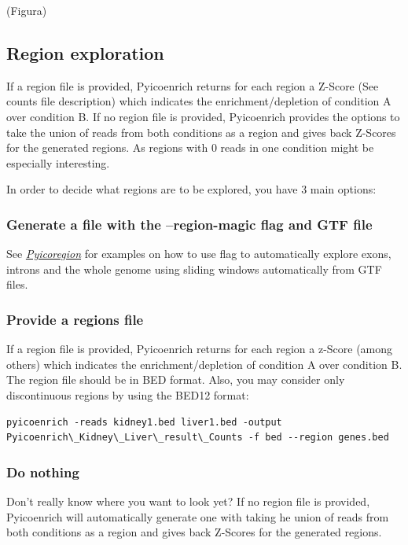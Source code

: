 \documentclass[letterpaper,10pt,english]{sphinxmanual}
\begin{document}
(Figura)


\subsection{Region exploration}
\label{pyicoenrich:region-exploration}
If a region file is provided, Pyicoenrich returns for each region a Z-Score (See counts file description) which indicates the enrichment/depletion of condition A over condition B. If no region file is provided, Pyicoenrich provides the options to take the union of reads from both conditions as a region and gives back Z-Scores for the generated regions. As regions with 0 reads in one condition might be especially interesting.

In order to decide what regions are to be explored, you have 3 main options:


\subsubsection{Generate a file with the --region-magic flag and GTF file}
\label{pyicoenrich:generate-a-file-with-the-region-magic-flag-and-gtf-file}
See {\hyperref[pyicoregion:pyicoregiondocs]{\emph{Pyicoregion}}} for examples on how to use  flag to automatically explore exons, introns and the whole genome using sliding windows automatically from GTF files.


\subsubsection{Provide a regions file}
\label{pyicoenrich:provide-a-regions-file}
If a region file is provided, Pyicoenrich returns for each region a z-Score (among others) which indicates the enrichment/depletion of condition A over condition B. The region file should be in BED format. Also, you may consider only discontinuous regions by using the BED12 format:

\begin{Verbatim}[commandchars=\\\{\}]
pyicoenrich -reads kidney1.bed liver1.bed -output Pyicoenrich\_Kidney\_Liver\_result\_Counts -f bed --region genes.bed
\end{Verbatim}


\subsubsection{Do nothing}
\label{pyicoenrich:do-nothing}
Don't really know where you want to look yet? If no region file is provided, Pyicoenrich will automatically generate one with taking he union of reads from both conditions as a region and gives back Z-Scores for the generated regions.
\end{document}
